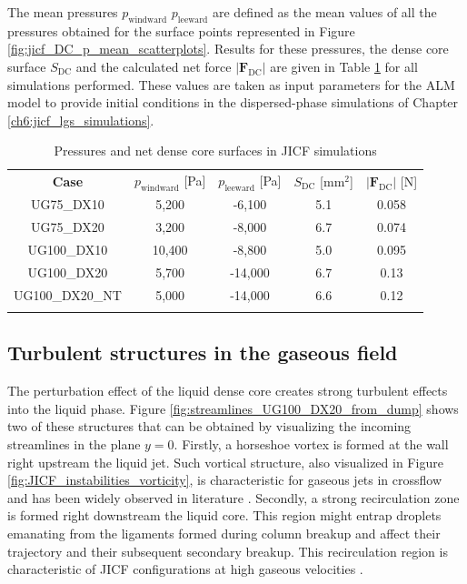 The mean pressures $p_\mathrm{windward}$ $p_\mathrm{leeward}$ are defined as the mean values of all the pressures obtained for the surface points represented in Figure \ref{fig:jicf_DC_p_mean_scatterplots}. Results for these pressures, the dense core surface $S_\mathrm{DC}$ and the calculated net force $|\boldsymbol{F}_\mathrm{DC}|$ are given in Table \ref{tab:dense_core_pressures_and_force_parameters} for all simulations performed. These values are taken as input parameters for the ALM model to provide initial conditions in the dispersed-phase simulations of Chapter \ref{ch6:jicf_lgs_simulations}.


\begin{table}[!h]
\centering
\caption{Pressures and net dense core surfaces in JICF simulations}
\begin{tabular}{ccccc}
\thickhline
\textbf{Case} & $p_\mathrm{windward}$ [Pa] & $p_\mathrm{leeward}$ [Pa] & $S_\mathrm{DC}$ [mm$^2$]& $|\boldsymbol{F}_\mathrm{DC}|$ [N] \\
\thickhline 
UG75\_DX10  & 5,200 & -6,100 & 5.1 & 0.058  \\
UG75\_DX20  & 3,200 & -8,000 & 6.7 & 0.074 \\
UG100\_DX10 & 10,400 & -8,800 & 5.0 & 0.095 \\
UG100\_DX20 & 5,700 & -14,000 & 6.7 & 0.13 \\
UG100\_DX20\_NT & 5,000 & -14,000 & 6.6 & 0.12 \\
\thickhline
\end{tabular}
\label{tab:dense_core_pressures_and_force_parameters}
\end{table}



\subsection{Turbulent structures in the gaseous field}
\label{ch5:subsec_turbulent_structures_in_gaseous_field}

The perturbation effect of the liquid dense core creates strong turbulent effects into the liquid phase. Figure \ref{fig:streamlines_UG100_DX20_from_dump} shows two of these structures that can be obtained by visualizing the incoming streamlines in the plane $y = 0$. Firstly, a horseshoe vortex is formed at the wall right upstream the liquid jet. Such vortical structure, also visualized in Figure \ref{fig:JICF_instabilities_vorticity}, is characteristic for gaseous jets in crossflow and has been widely observed in literature . Secondly, a strong recirculation zone is formed right downstream the liquid core. This region might entrap droplets emanating from the ligaments formed during column breakup and affect their trajectory and their subsequent secondary breakup. This recirculation region is characteristic of JICF configurations at high gaseous velocities .

